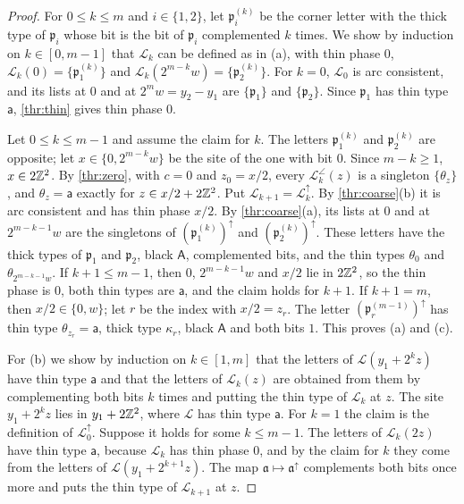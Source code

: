 \begin{proof}
For $0\le k\le m$ and $i\in\{1,2\}$, let $\mathfrak p_i^{(k)}$ be the corner letter with the thick type of $\mathfrak p_i$ whose bit is the bit of $\mathfrak p_i$ complemented $k$ times. We show by induction on $k\in[0,m-1]$ that $\mathcal L_k$ can be defined as in (a), with thin phase $0$, $\mathcal L_k(0)=\{\mathfrak p_1^{(k)}\}$ and $\mathcal L_k(2^{m-k}w)=\{\mathfrak p_2^{(k)}\}$. For $k=0$, $\mathcal L_0$ is arc consistent, and its lists at $0$ and at $2^mw=y_2-y_1$ are $\{\mathfrak p_1\}$ and $\{\mathfrak p_2\}$. Since $\mathfrak p_1$ has thin type $\mathsf a$, \cref{thr:thin} gives thin phase $0$.

Let $0\le k\le m-1$ and assume the claim for $k$. The letters $\mathfrak p_1^{(k)}$ and $\mathfrak p_2^{(k)}$ are opposite; let $x\in\{0,2^{m-k}w\}$ be the site of the one with bit $0$. Since $m-k\ge1$, $x\in2\mathbb{Z}^2$. By \cref{thr:zero}, with $c=0$ and $z_0=x/2$, every $\mathcal L_k^{\angle}(z)$ is a singleton $\{\theta_z\}$, and $\theta_z=\mathsf a$ exactly for $z\in x/2+2\mathbb{Z}^2$. Put $\mathcal L_{k+1}=\mathcal L_k^{\uparrow}$. By \cref{thr:coarse}(b) it is arc consistent and has thin phase $x/2$. By \cref{thr:coarse}(a), its lists at $0$ and at $2^{m-k-1}w$ are the singletons of $(\mathfrak p_1^{(k)})^{\uparrow}$ and $(\mathfrak p_2^{(k)})^{\uparrow}$. These letters have the thick types of $\mathfrak p_1$ and $\mathfrak p_2$, black $\mathsf A$, complemented bits, and the thin types $\theta_0$ and $\theta_{2^{m-k-1}w}$. If $k+1\le m-1$, then $0$, $2^{m-k-1}w$ and $x/2$ lie in $2\mathbb{Z}^2$, so the thin phase is $0$, both thin types are $\mathsf a$, and the claim holds for $k+1$. If $k+1=m$, then $x/2\in\{0,w\}$; let $r$ be the index with $x/2=z_r$. The letter $(\mathfrak p_r^{(m-1)})^{\uparrow}$ has thin type $\theta_{z_r}=\mathsf a$, thick type $\kappa_r$, black $\mathsf A$ and both bits $1$. This proves (a) and (c).

For (b) we show by induction on $k\in[1,m]$ that the letters of $\mathcal L(y_1+2^kz)$ have thin type $\mathsf a$ and that the letters of $\mathcal L_k(z)$ are obtained from them by complementing both bits $k$ times and putting the thin type of $\mathcal L_k$ at $z$. The site $y_1+2^kz$ lies in $y_1+2\mathbb{Z}^2$, where $\mathcal L$ has thin type $\mathsf a$. For $k=1$ the claim is the definition of $\mathcal L_0^{\uparrow}$. Suppose it holds for some $k\le m-1$. The letters of $\mathcal L_k(2z)$ have thin type $\mathsf a$, because $\mathcal L_k$ has thin phase $0$, and by the claim for $k$ they come from the letters of $\mathcal L(y_1+2^{k+1}z)$. The map $\mathfrak a\mapsto\mathfrak a^{\uparrow}$ complements both bits once more and puts the thin type of $\mathcal L_{k+1}$ at $z$.


\end{proof}
